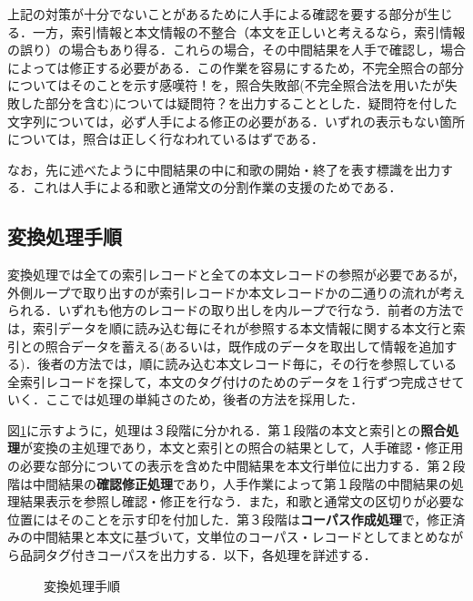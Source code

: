 \begin{itemize}
上記の対策が十分でないことがあるために人手による確認を要する部分が生じる．一方，索引情報と本文情報の不整合（本文を正しいと考えるなら，索引情報の誤り）の場合もあり得る．これらの場合，その中間結果を人手で確認し，場合によっては修正する必要がある．この作業を容易にするため，不完全照合の部分についてはそのことを示す感嘆符！を，照合失敗部(不完全照合法を用いたが失敗した部分を含む)については疑問符？を出力することとした．疑問符を付した文字列については，必ず人手による修正の必要がある．いずれの表示もない箇所については，照合は正しく行なわれているはずである．

なお，先に述べたように中間結果の中に和歌の開始・終了を表す標識を出力する．これは人手による和歌と通常文の分割作業の支援のためである．


\end{itemize}

\subsection{変換処理手順}
\label{sec:Method}
変換処理では全ての索引レコードと全ての本文レコードの参照が必要であるが，外側ループで取り出すのが索引レコードか本文レコードかの二通りの流れが考えられる．いずれも他方のレコードの取り出しを内ループで行なう．前者の方法では，索引データを順に読み込む毎にそれが参照する本文情報に関する本文行と索引との照合データを蓄える(あるいは，既作成のデータを取出して情報を追加する)．後者の方法では，順に読み込む本文レコード毎に，その行を参照している全索引レコードを探して，本文のタグ付けのためのデータを１行ずつ完成させていく．ここでは処理の単純さのため，後者の方法を採用した．


図\ref{Flow}に示すように，処理は３段階に分かれる．第１段階の本文と索引との{\bf 照合処理}が変換の主処理であり，本文と索引との照合の結果として，人手確認・修正用の必要な部分についての表示を含めた中間結果を本文行単位に出力する．第２段階は中間結果の{\bf 確認修正処理}であり，人手作業によって第１段階の中間結果の処理結果表示を参照し確認・修正を行なう．また，和歌と通常文の区切りが必要な位置にはそのことを示す印を付加した．第３段階は{\bf コーパス作成処理}で，修正済みの中間結果と本文に基づいて，文単位のコーパス・レコードとしてまとめながら品詞タグ付きコーパスを出力する．以下，各処理を詳述する．



\begin{figure}[bt]
\begin{center}
\end{center}
\caption{変換処理手順}
\label{Flow}
\end{figure}

